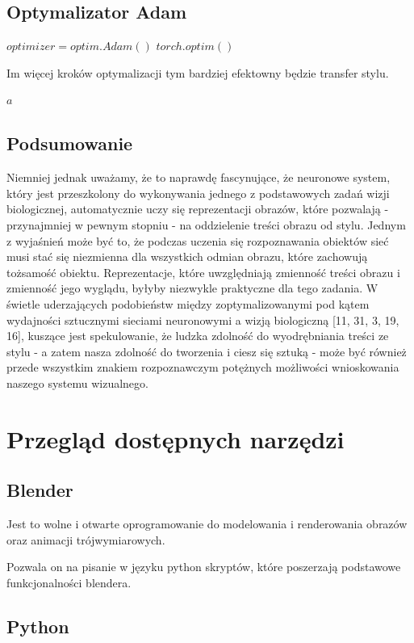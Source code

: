 \documentclass[brudnopis]{xmgr}
\begin{document}
\section{Optymalizator Adam\label{s:dsssl}}

$optimizer = optim.Adam()$
$torch.optim()$

Im więcej kroków optymalizacji tym bardziej efektowny będzie transfer stylu.


$a$

\section{Podsumowanie\label{s:dsssl}}
Niemniej jednak uważamy, że to naprawdę fascynujące, że neuronowe
system, który jest przeszkolony do wykonywania jednego z podstawowych zadań wizji biologicznej, automatycznie uczy się reprezentacji obrazów, które pozwalają - przynajmniej w pewnym stopniu - na oddzielenie treści obrazu od stylu. Jednym z wyjaśnień może być to, że podczas uczenia się rozpoznawania obiektów sieć musi stać się niezmienna dla wszystkich odmian obrazu, które zachowują tożsamość obiektu. Reprezentacje, które uwzględniają zmienność treści obrazu i zmienność jego wyglądu, byłyby niezwykle praktyczne dla tego zadania. W świetle uderzających podobieństw między zoptymalizowanymi pod kątem wydajności sztucznymi sieciami neuronowymi a wizją biologiczną [11, 31, 3, 19, 16], kuszące jest spekulowanie, że ludzka zdolność do wyodrębniania treści ze stylu - a zatem nasza zdolność do tworzenia i ciesz się sztuką - może być również przede wszystkim znakiem rozpoznawczym potężnych możliwości wnioskowania naszego systemu wizualnego.

\chapter{Przegląd dostępnych narzędzi}

\section{Blender\label{s:dsssl}}

Jest to wolne i otwarte oprogramowanie do modelowania i renderowania obrazów oraz animacji trójwymiarowych.

Pozwala on na pisanie w języku python skryptów, które poszerzają podstawowe funkcjonalności blendera.

\section{Python\label{s:dsssl}}
\end{document}
